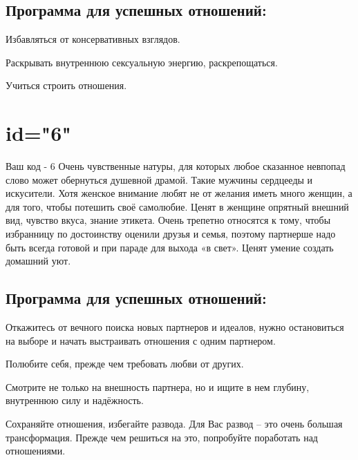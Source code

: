 \subsection{Программа для успешных отношений:}
\item Избавляться от консервативных взглядов.
\item Раскрывать внутреннюю сексуальную энергию, раскрепощаться.
\item Учиться строить отношения.
\endsubsection
\endsection

\section{id="6"}{Ваш код - 6}
Очень чувственные натуры, для которых любое сказанное невпопад слово 
может обернуться душевной драмой. Такие мужчины сердцееды и искусители. 
Хотя женское внимание любят не от желания иметь много женщин, а для 
того, чтобы потешить своё самолюбие. Ценят в женщине опрятный внешний 
вид, чувство вкуса, знание этикета. Очень трепетно относятся к тому, 
чтобы избранницу по достоинству оценили друзья и семья, поэтому 
партнерше надо быть всегда готовой и при параде для выхода «в свет». 
Ценят умение создать домашний уют.
\subsection{Программа для успешных отношений:}
\item Откажитесь от вечного поиска новых партнеров и идеалов, нужно 
остановиться на выборе и начать выстраивать отношения с одним партнером.
\item Полюбите себя, прежде чем требовать любви от других.
\item Смотрите не только на внешность партнера, но и ищите в нем 
глубину, внутреннюю силу и надёжность.
\item Сохраняйте отношения, избегайте развода. Для Вас развод – это 
очень большая трансформация. Прежде чем решиться на это, попробуйте 
поработать над отношениями.
\endsubsection
\endsection

